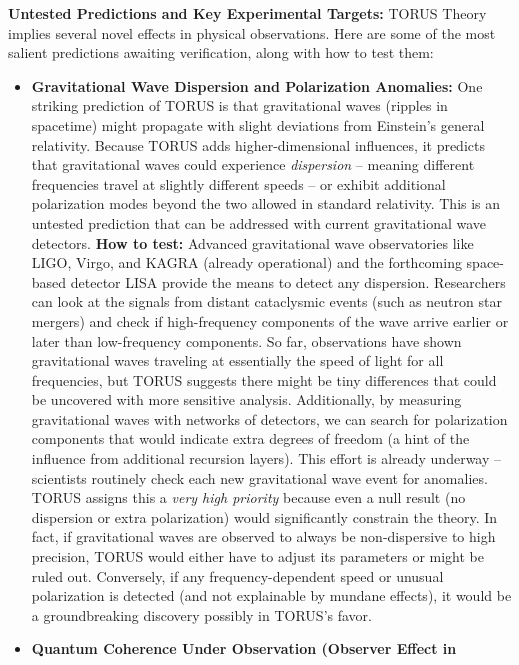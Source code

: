 \documentclass[]{article}
\begin{document}
\textbf{Untested Predictions and Key Experimental Targets:} TORUS Theory
implies several novel effects in physical observations. Here are some of
the most salient predictions awaiting verification, along with how to
test them:

\begin{itemize}
\item
  \textbf{Gravitational Wave Dispersion and Polarization Anomalies:} One
  striking prediction of TORUS is that gravitational waves (ripples in
  spacetime) might propagate with slight deviations from Einstein's
  general relativity. Because TORUS adds higher-dimensional influences,
  it predicts that gravitational waves could experience
  \emph{dispersion} -- meaning different frequencies travel at slightly
  different speeds -- or exhibit additional polarization modes beyond
  the two allowed in standard relativity. This is an untested prediction
  that can be addressed with current gravitational wave detectors.
  \textbf{How to test:} Advanced gravitational wave observatories like
  LIGO, Virgo, and KAGRA (already operational) and the forthcoming
  space-based detector LISA provide the means to detect any dispersion.
  Researchers can look at the signals from distant cataclysmic events
  (such as neutron star mergers) and check if high-frequency components
  of the wave arrive earlier or later than low-frequency components. So
  far, observations have shown gravitational waves traveling at
  essentially the speed of light for all frequencies, but TORUS suggests
  there might be tiny differences that could be uncovered with more
  sensitive analysis​. Additionally, by measuring gravitational waves
  with networks of detectors, we can search for polarization components
  that would indicate extra degrees of freedom (a hint of the influence
  from additional recursion layers). This effort is already underway --
  scientists routinely check each new gravitational wave event for
  anomalies. TORUS assigns this a \emph{very high priority} because even
  a null result (no dispersion or extra polarization) would
  significantly constrain the theory​. In fact, if gravitational waves
  are observed to always be non-dispersive to high precision, TORUS
  would either have to adjust its parameters or might be ruled out.
  Conversely, if any frequency-dependent speed or unusual polarization
  is detected (and not explainable by mundane effects), it would be a
  groundbreaking discovery possibly in TORUS's favor.
\item
  \textbf{Quantum Coherence Under Observation (Observer Effect in
}
\end{itemize}
\end{document}
